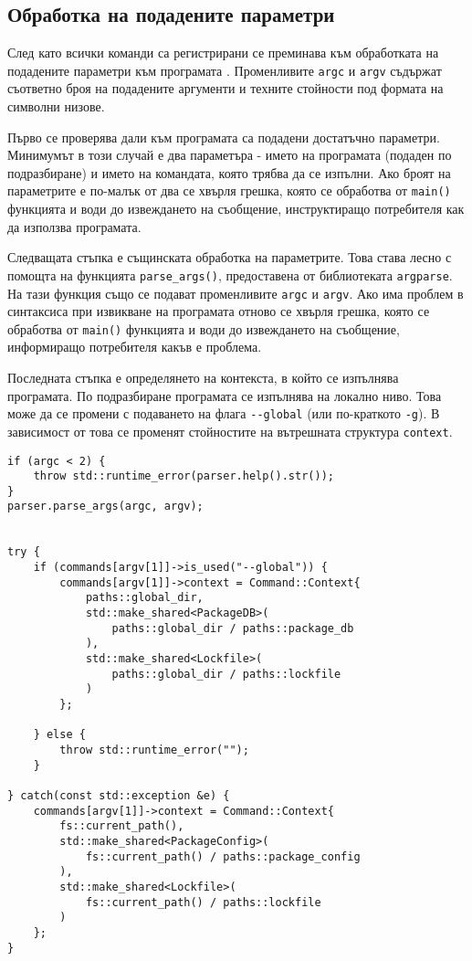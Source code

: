 \subsection{Обработка на подадените параметри}

След като всички команди са регистрирани се преминава към обработката на
подадените параметри към програмата . Променливите
\texttt{argc} и \texttt{argv} съдържат съответно броя на подадените аргументи и
техните стойности под формата на символни низове.

Първо се проверява дали към програмата са подадени достатъчно параметри.
Минимумът в този случай е два параметъра - името на програмата (подаден по
подразбиране) и името на командата, която трябва да се изпълни. Ако броят на
параметрите е по-малък от два се хвърля грешка, която се обработва от
\texttt{main()} функцията и води до извеждането на съобщение, инструктиращо
потребителя как да използва програмата.

Следващата стъпка е същинската обработка на параметрите. Това става лесно с
помощта на функцията \texttt{parse\_args()}, предоставена от библиотеката
\texttt{argparse}. На тази функция също се подават променливите \texttt{argc}
и \texttt{argv}. Ако има проблем в синтаксиса при извикване на програмата отново
се хвърля грешка, която се обработва от \texttt{main()} функцията и води до
извеждането на съобщение, информиращо потребителя какъв е проблема.

Последната стъпка е определянето на контекста, в който се изпълнява програмата.
По подразбиране програмата се изпълнява на локално ниво. Това може да се промени
с подаването на флага \texttt{-{}-global} (или по-краткото \texttt{-g}). В
зависимост от това се променят стойностите на вътрешната структура
\texttt{context}.

\begin{lstlisting}[style=cpp,
				   caption=Обработка на подадените параметри,
				   label={lst:parse}]
if (argc < 2) {
	throw std::runtime_error(parser.help().str());
}
parser.parse_args(argc, argv);


try {
	if (commands[argv[1]]->is_used("--global")) {
		commands[argv[1]]->context = Command::Context{
			paths::global_dir,
			std::make_shared<PackageDB>(
				paths::global_dir / paths::package_db
			),
			std::make_shared<Lockfile>(
				paths::global_dir / paths::lockfile
			)
		};

	} else {
		throw std::runtime_error("");
	}

} catch(const std::exception &e) {
	commands[argv[1]]->context = Command::Context{
		fs::current_path(),
		std::make_shared<PackageConfig>(
			fs::current_path() / paths::package_config
		),
		std::make_shared<Lockfile>(
			fs::current_path() / paths::lockfile
		)
	};
}
\end{lstlisting}


